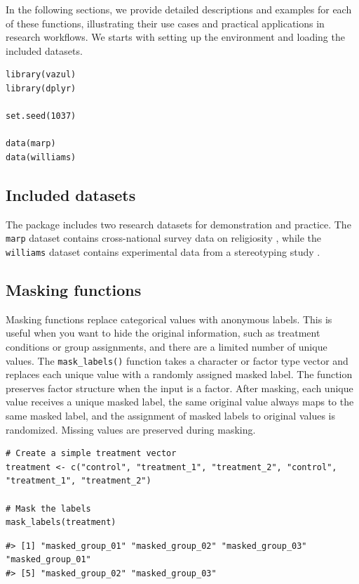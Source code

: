 In the following sections, we provide detailed descriptions and examples for each of these functions, illustrating their use cases and practical applications in research workflows. We starts with setting up the environment and loading the included datasets.

\begin{verbatim}
library(vazul)
library(dplyr)

set.seed(1037)

data(marp)
data(williams)
\end{verbatim}

\subsection{Included datasets}\label{included-datasets}

The  package includes two research datasets for demonstration and practice. The \texttt{marp} dataset contains cross-national survey data on religiosity \citep{MARP2022discussion}, while the \texttt{williams} dataset contains experimental data from a stereotyping study \citep{Sarafoglou2025-fr}.

\subsection{Masking functions}\label{masking-functions}

Masking functions replace categorical values with anonymous labels. This is useful when you want to hide the original information, such as treatment conditions or group assignments, and there are a limited number of unique values. The \texttt{mask\_labels()} function takes a character or factor type vector and replaces each unique value with a randomly assigned masked label. The function preserves factor structure when the input is a factor. After masking, each unique value receives a unique masked label, the same original value always maps to the same masked label, and the assignment of masked labels to original values is randomized. Missing values are preserved during masking.

\begin{verbatim}
# Create a simple treatment vector
treatment <- c("control", "treatment_1", "treatment_2", "control", "treatment_1", "treatment_2")

# Mask the labels
mask_labels(treatment)
\end{verbatim}

\begin{verbatim}
#> [1] "masked_group_01" "masked_group_02" "masked_group_03" "masked_group_01"
#> [5] "masked_group_02" "masked_group_03"
\end{verbatim}


